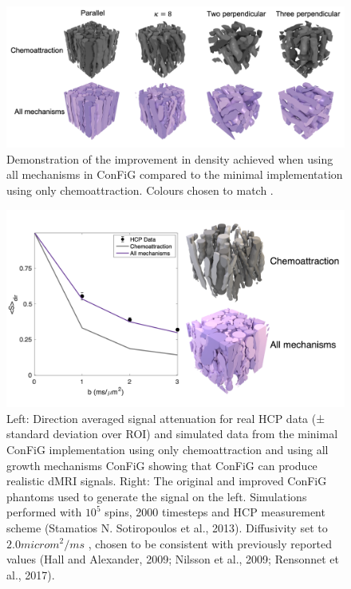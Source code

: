 \begin{figure}
  \centering
  \includegraphics[width=\textwidth]{figures/config/improvement_3drender.png}
  \caption[Impact of biological mechanisms on 3D phantoms]{Demonstration of the improvement in density achieved when using all mechanisms in \ac{ConFiG} compared to the minimal implementation using only chemoattraction. Colours chosen to match . }
  \label{fig:config_res_improvements_3d}
\end{figure}

\begin{figure}
  \centering
  \includegraphics[width=\textwidth]{figures/config/hcp_old_vs_new_figure_whitebg.png}
  \caption[Impact of improvements on simulated \ac{dMRI} signal]{Left: Direction averaged signal attenuation for real \ac{HCP} data (± standard deviation over ROI) and simulated data from the minimal \ac{ConFiG} implementation using only chemoattraction and using all growth mechanisms \ac{ConFiG} showing that \ac{ConFiG} can produce realistic \ac{dMRI} signals. Right: The original and improved \ac{ConFiG} phantoms used to generate the signal on the left. Simulations performed with $10^5$ spins, 2000 timesteps and \ac{HCP} measurement scheme (Stamatios N. Sotiropoulos et al., 2013). Diffusivity set to $2.0microm ^2/ms$ , chosen to be consistent with previously reported values (Hall and Alexander, 2009; Nilsson et al., 2009; Rensonnet et al., 2017).  }
  \label{fig:config_res_improvements_sig}
\end{figure}

